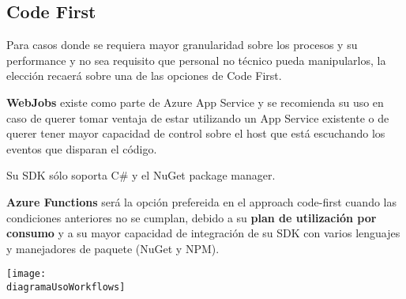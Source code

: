 \documentclass[a4paper]{article}
\newcommand{\diagramaUsoWorkflows}{images/diagram.png}
\begin{document}
    \subsection{Code First}
    Para casos donde se requiera mayor granularidad sobre los procesos y su performance y no sea requisito que personal no técnico pueda manipularlos, la elección recaerá sobre una de las opciones de Code First.

    \textbf{WebJobs} existe como parte de Azure App Service y se recomienda su uso en caso de querer tomar ventaja de estar utilizando un App Service existente o de querer tener mayor capacidad de control sobre el host que está escuchando los eventos que disparan el código.

    Su SDK sólo soporta C\# y el NuGet package manager.

    \textbf{Azure Functions} será la opción prefereida en el approach code-first cuando las condiciones anteriores no se cumplan, debido a su \textbf{plan de utilización por consumo} y a su mayor capacidad de integración de su SDK con varios lenguajes y manejadores de paquete (NuGet y NPM).

    \vspace{0.7cm}

    \texttt{[image: \\diagramaUsoWorkflows]}\par
    
\end{document}
